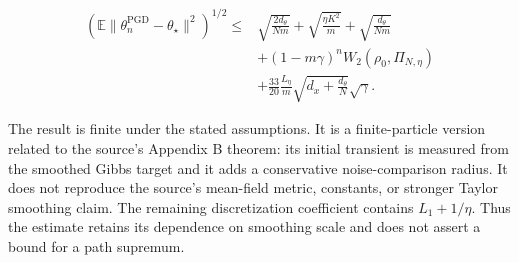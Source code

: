 \documentclass[11pt,a4paper]{report}
\begin{document}
\[
\begin{aligned}
\left(\mathbb E\|\theta^{\mathrm{PGD}}_n-\theta_\star\|^2\right)^{1/2}
\le{}&\sqrt{\frac{2d_\theta}{Nm}}
 +\sqrt{\frac{\eta K^2}{m}}+\sqrt{\frac{d_\theta}{Nm}}\\
&+(1-m\gamma)^nW_2(\rho_0,\Pi_{N,\eta})\\
&+\frac{33}{20}\frac{L_\eta}{m}
 \sqrt{d_x+\frac{d_\theta}{N}}\sqrt\gamma.
\end{aligned}
\]

The result is finite under the stated assumptions. It is a finite-particle version related to the source’s Appendix B theorem: its initial transient is measured from the smoothed Gibbs target and it adds a conservative noise-comparison radius. It does not reproduce the source’s mean-field metric, constants, or stronger Taylor smoothing claim. The remaining discretization coefficient contains \(L_1+1/\eta\). Thus the estimate retains its dependence on smoothing scale and does not assert a bound for a path supremum.
\end{document}
